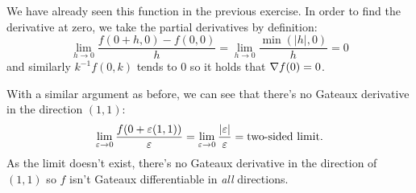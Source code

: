 \documentclass[12pt]{memoir}
\begin{document}
\begin{ptcbr}
    We have already seen this function in the previous exercise. In order to find the derivative at zero, we take the partial derivatives by definition:
    $$\lim_{h\to 0}\frac{f(0+h,0)-f(0,0)}{h}=\lim_{h\to 0}\frac{\min(|h|,0)}{h}=0$$
    and similarly $k^{-1}f(0,k)$ tends to $0$ so it holds that $\nabla f(0)=0$.\par 
    With a similar argument as before, we can see that there's no Gateaux derivative in the direction $(1,1)$:
    $$\lim_{\varepsilon\to 0}\frac{f(0+\varepsilon(1,1))}{\varepsilon}=\lim_{\varepsilon\to0}\frac{|\varepsilon|}{\varepsilon}=\text{two-sided limit}.$$
    As the limit doesn't exist, there's no Gateaux derivative in the direction of $(1,1)$ so $f$ isn't Gateaux differentiable in \emph{all} directions.
\end{ptcbr}
\end{document}
